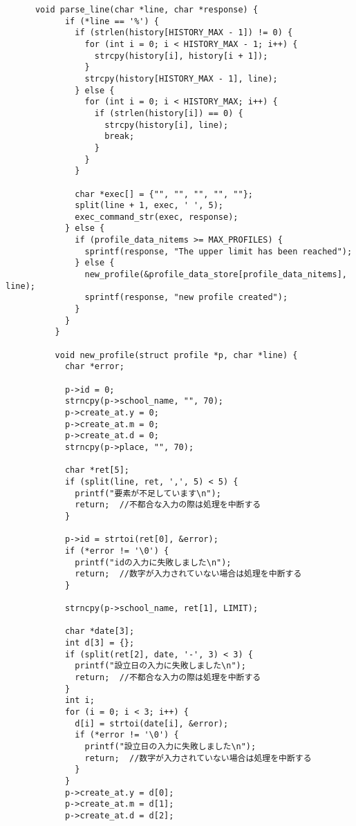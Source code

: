 \documentclass[11pt]{jsarticle}
\begin{document}
\begin{verbatim}
      void parse_line(char *line, char *response) {
            if (*line == '%') {
              if (strlen(history[HISTORY_MAX - 1]) != 0) {
                for (int i = 0; i < HISTORY_MAX - 1; i++) {
                  strcpy(history[i], history[i + 1]);
                }
                strcpy(history[HISTORY_MAX - 1], line);
              } else {
                for (int i = 0; i < HISTORY_MAX; i++) {
                  if (strlen(history[i]) == 0) {
                    strcpy(history[i], line);
                    break;
                  }
                }
              }
          
              char *exec[] = {"", "", "", "", ""};
              split(line + 1, exec, ' ', 5);
              exec_command_str(exec, response);
            } else {
              if (profile_data_nitems >= MAX_PROFILES) {
                sprintf(response, "The upper limit has been reached");
              } else {
                new_profile(&profile_data_store[profile_data_nitems], line);
                sprintf(response, "new profile created");
              }
            }
          }
          
          void new_profile(struct profile *p, char *line) {
            char *error;
          
            p->id = 0;
            strncpy(p->school_name, "", 70);
            p->create_at.y = 0;
            p->create_at.m = 0;
            p->create_at.d = 0;
            strncpy(p->place, "", 70);
          
            char *ret[5];
            if (split(line, ret, ',', 5) < 5) {
              printf("要素が不足しています\n");
              return;  //不都合な入力の際は処理を中断する
            }
          
            p->id = strtoi(ret[0], &error);
            if (*error != '\0') {
              printf("idの入力に失敗しました\n");
              return;  //数字が入力されていない場合は処理を中断する
            }
          
            strncpy(p->school_name, ret[1], LIMIT);
          
            char *date[3];
            int d[3] = {};
            if (split(ret[2], date, '-', 3) < 3) {
              printf("設立日の入力に失敗しました\n");
              return;  //不都合な入力の際は処理を中断する
            }
            int i;
            for (i = 0; i < 3; i++) {
              d[i] = strtoi(date[i], &error);
              if (*error != '\0') {
                printf("設立日の入力に失敗しました\n");
                return;  //数字が入力されていない場合は処理を中断する
              }
            }
            p->create_at.y = d[0];
            p->create_at.m = d[1];
            p->create_at.d = d[2];
          

\end{verbatim}
\end{document}
